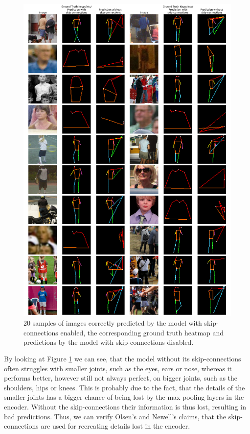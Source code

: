 \documentclass[./main.tex]{subfiles}
\begin{document}
\begin{figure}[htbp]
    \centering
    \includegraphics[width = \textwidth]{entities/pred_comparisons.png}
    \caption{20 samples of images correctly predicted by the model with skip-connections enabled, the corresponding ground truth heatmap and predictions by the model with skip-connections disabled.}
    \label{fig:pred_comparison}
\end{figure}
By looking at Figure \ref{fig:pred_comparison} we can see, that the model without its skip-connections often struggles with smaller joints, such as the eyes, ears or nose, whereas it performs better, however still not always perfect, on bigger joints, such as the shoulders, hips or knees. This is probably due to the fact, that the details of the smaller joints has a bigger chance of being lost by the max pooling layers in the encoder. Without the skip-connections their information is thus lost, resulting in bad predictions. Thus, we can verify Olsen's \cite{Camilla} and Newell's \cite{Newell} claims, that the skip-connections are used for recreating details lost in the encoder. 
\end{document}
